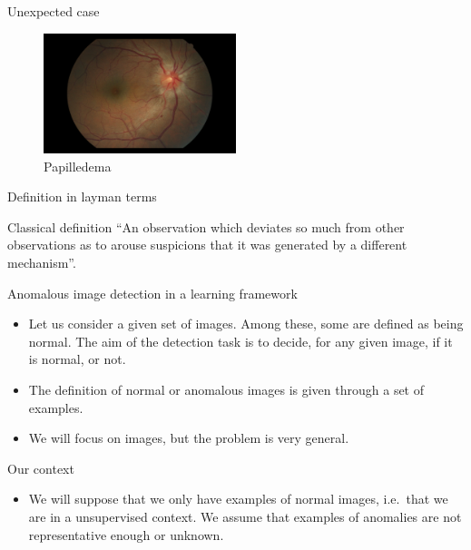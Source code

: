\documentclass[xcolor=pdftex,dvipsnames,table,mathserif]{beamer}
\begin{document}
\begin{frame}{Unexpected case}

\begin{figure}[ht]
  \centering
  \includegraphics[width=0.5\textwidth]{ret-oedeme}
  \caption{Papilledema}
\end{figure}


\end{frame}


\begin{frame}{Definition in layman terms}

  \begin{block}{Classical definition \cite{hawkins_identification_1980}}
    ``An observation which deviates so much from other observations as to arouse suspicions that it was generated by a different mechanism''.
  \end{block}

\end{frame}

\begin{frame}{Anomalous image detection in a learning framework}

    \begin{itemize}
    \item Let us consider a given set of images. Among these, some  are defined as being \alert{normal}. The aim of the detection task is to decide, for any given image, if it is normal, or not.
    \item The definition of normal or anomalous images is given through a set of examples.
  \item We will focus on images, but the problem is very general.
    \end{itemize}

\begin{block}{Our context}

  \begin{itemize}
  \item We will suppose that we only have examples of normal images, i.e.\ that we are in a \alert{unsupervised} context. We assume that examples of anomalies are not representative enough or unknown.
  \end{itemize}

\end{block}




\end{frame}
\end{document}

